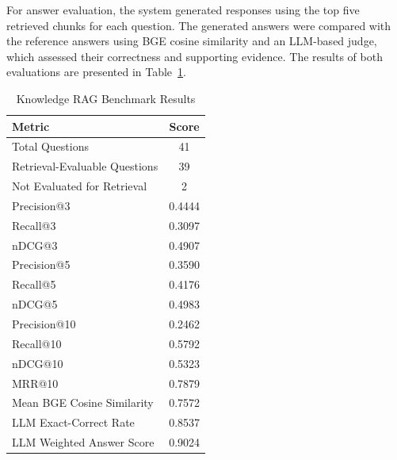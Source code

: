 \documentclass[conference]{IEEEtran}
\begin{document}
For answer evaluation, the system generated responses using the top five retrieved chunks for each question. The generated answers were compared with the reference answers using BGE cosine similarity and an LLM-based judge, which assessed their correctness and supporting evidence. The results of both evaluations are presented in Table~\ref{tab:knowledge_rag}.
\begin{table}
\centering
\footnotesize
\renewcommand{\arraystretch}{1.4}
\setlength{\tabcolsep}{7pt}
\begin{tabular}{|l|c|}
\hline
\textbf{Metric} & \textbf{Score} \\ \hline
Total Questions & 41 \\ \hline
Retrieval-Evaluable Questions & 39 \\ \hline
Not Evaluated for Retrieval & 2 \\ \hline
Precision@3 & 0.4444 \\ \hline
Recall@3 & 0.3097 \\ \hline
nDCG@3 & 0.4907 \\ \hline
Precision@5 & 0.3590 \\ \hline
Recall@5 & 0.4176 \\ \hline
nDCG@5 & 0.4983 \\ \hline
Precision@10 & 0.2462 \\ \hline
Recall@10 & 0.5792 \\ \hline
nDCG@10 & 0.5323 \\ \hline
MRR@10 & 0.7879 \\ \hline
Mean BGE Cosine Similarity & 0.7572 \\ \hline
LLM Exact-Correct Rate & 0.8537 \\ \hline
LLM Weighted Answer Score & 0.9024 \\ \hline
\end{tabular}
\renewcommand{\arraystretch}{1}
\setlength{\tabcolsep}{6pt}
\caption{Knowledge RAG Benchmark Results}
\label{tab:knowledge_rag}
\end{table}
\end{document}
